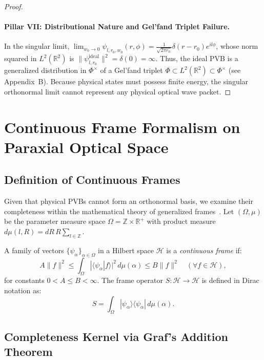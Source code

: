 \documentclass[11pt,a4paper]{article}
\begin{document}
\begin{proof}
\paragraph{Pillar VII: Distributional Nature and Gel'fand Triplet Failure.}
In the singular limit, $\lim_{w_0 \to 0} \psi_{l, r_0, w_0}(r, \phi) = \frac{1}{\sqrt{2\pi r_0}} \delta(r - r_0) e^{i l \phi}$, whose norm squared in $L^2(\mathbb{R}^2)$ is $\|\psi_{l, r_0}^{\text{ideal}}\|^2 = \delta(0) = \infty$. Thus, the ideal PVB is a generalized distribution in $\Phi^\times$ of a Gel'fand triplet $\Phi \subset L^2(\mathbb{R}^2) \subset \Phi^\times$ (see Appendix~B). Because physical states must possess finite energy, the singular orthonormal limit cannot represent any physical optical wave packet.
\end{proof}

\section{Continuous Frame Formalism on Paraxial Optical Space}
\label{sec:frame}

\subsection{Definition of Continuous Frames}

Given that physical PVBs cannot form an orthonormal basis, we examine their completeness within the mathematical theory of generalized frames~\cite{Duffin1952,Ali1993,Daubechies1990}. Let $(\Omega, \mu)$ be the parameter measure space $\Omega = \mathbb{Z} \times \mathbb{R}^+$ with product measure $d\mu(l, R) = dR \, R \sum_{l \in \mathbb{Z}}$.

A family of vectors $\{\psi_\alpha\}_{\alpha \in \Omega}$ in a Hilbert space $\mathcal{H}$ is a \emph{continuous frame} if:
\begin{equation}
A \|f\|^2 \le \int_\Omega |\langle \psi_\alpha | f \rangle|^2 \, d\mu(\alpha) \le B \|f\|^2 \quad (\forall f \in \mathcal{H}),
\label{eq:frame_inequality}
\end{equation}
for constants $0 < A \le B < \infty$. The frame operator $S: \mathcal{H} \to \mathcal{H}$ is defined in Dirac notation as:
\begin{equation}
S = \int_\Omega |\psi_\alpha \rangle \langle \psi_\alpha | \, d\mu(\alpha).
\end{equation}

\subsection{Completeness Kernel via Graf's Addition Theorem}
\end{document}
